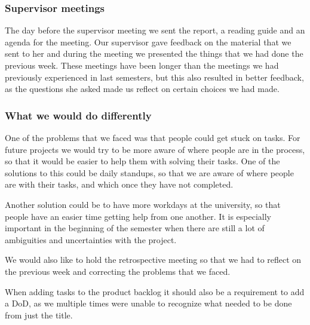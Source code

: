 \subsubsection{Supervisor meetings}
The day before the supervisor meeting we sent the report, a reading guide and an agenda for the meeting.
Our supervisor gave feedback on the material that we sent to her and during the meeting we presented the things that we had done the previous week.
These meetings have been longer than the meetings we had previously experienced in last semesters, but this also resulted in better feedback, as the questions she asked made us reflect on certain choices we had made.

\subsubsection{What we would do differently}
One of the problems that we faced was that people could get stuck on tasks.
For future projects we would try to be more aware of where people are in the process, so that it would be easier to help them with solving their tasks.
One of the solutions to this could be daily standups, so that we are aware of where people are with their tasks, and which once they have not completed.

Another solution could be to have more workdays at the university, so that people have an easier time getting help from one another.
It is especially important in the beginning of the semester when there are still a lot of ambiguities and uncertainties with the project.  

We would also like to hold the retrospective meeting so that we had to reflect on the previous week and correcting the problems that we faced.

When adding tasks to the product backlog it should also be a requirement to add a DoD, as we multiple times were unable to recognize what needed to be done from just the title.
